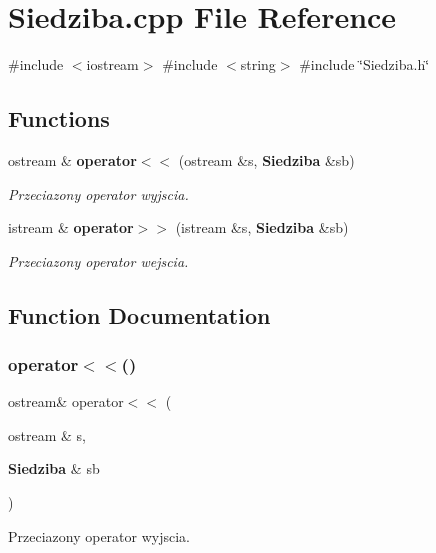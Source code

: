 \section{Siedziba.\+cpp File Reference}
\label{_siedziba_8cpp}
{\ttfamily \#include $<$iostream$>$}\newline
{\ttfamily \#include $<$string$>$}\newline
{\ttfamily \#include \char`\"{}Siedziba.\+h\char`\"{}}\newline
\subsection*{Functions}
\begin{DoxyCompactItemize}
\item 
ostream \& \textbf{ operator$<$$<$} (ostream \&s, \textbf{ Siedziba} \&sb)
\begin{DoxyCompactList}\small\item\em Przeciazony operator wyjscia. \end{DoxyCompactList}\item 
istream \& \textbf{ operator$>$$>$} (istream \&s, \textbf{ Siedziba} \&sb)
\begin{DoxyCompactList}\small\item\em Przeciazony operator wejscia. \end{DoxyCompactList}\end{DoxyCompactItemize}


\subsection{Function Documentation}
\mbox{\label{_siedziba_8cpp_a9f6b107d8d81cef2e0ed0a865b1790f9}} 
\subsubsection{operator$<$$<$()}
{\footnotesize\ttfamily ostream\& operator$<$$<$ (\begin{DoxyParamCaption}\item[{ostream \&}]{s,  }\item[{\textbf{ Siedziba} \&}]{sb }\end{DoxyParamCaption})}



Przeciazony operator wyjscia. 

